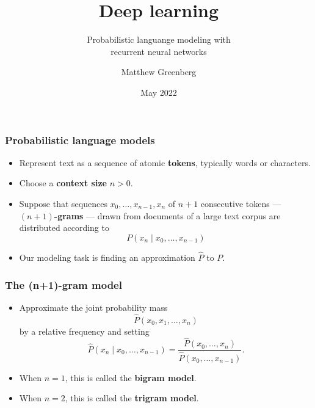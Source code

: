\documentclass{beamer}
\title{Deep learning}
\subtitle{Probabilistic languange modeling with\\recurrent neural networks}
\author{Matthew Greenberg}
\date{May 2022}
\begin{document}
    \begin{frame}
    \maketitle
    \end{frame}
   
    \begin{frame}
        \frametitle{Probabilistic language models}

        \begin{itemize}
            \setlength\itemsep{1em}
            \item Represent text as a sequence of atomic \textbf{tokens},
            typically words or characters.

            \item Choose a \textbf{context size} $n>0$.
            
            \item Suppose that sequences $x_0,\ldots,x_{n-1},x_n$ of $n+1$
            consecutive tokens --- \textbf{$(n+1)$-grams} --- drawn from documents of a large text corpus
            are distributed according to
            \[
                P(x_n\mid x_0,\ldots,x_{n-1})
            \]

            \item Our modeling task is finding an approximation $\widehat{P}$ to $P$.
        \end{itemize}
    \end{frame}

    \begin{frame}
        \frametitle{The (n+1)-gram model}

        \begin{itemize}
            \setlength\itemsep{1em}
            \item Approximate the joint probability mass
            \[
                \widehat{P}(x_0,x_1,\ldots,x_n)
            \]
            by a relative frequency and setting
            \[
                \widehat{P}(x_n\mid x_0,\ldots,x_{n-1}) = \frac{\widehat{P}(x_0,\ldots,x_n)}
                {\widehat{P}(x_0,\ldots,x_{n-1})}.
            \]

            \item When $n=1$, this is called the \textbf{bigram model}.
            \item When $n=2$, this is called the \textbf{trigram model}.
        \end{itemize}
    \end{frame}
\end{document}
